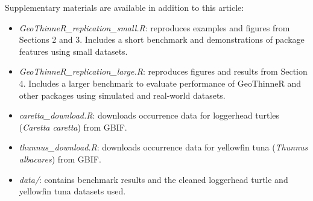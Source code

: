 Supplementary materials are available in addition to this article:

\begin{itemize}
\tightlist
\item
  \emph{GeoThinneR\_replication\_small.R}: reproduces examples and figures from Sections 2 and 3. Includes a short benchmark and demonstrations of package features using small datasets.
\item
  \emph{GeoThinneR\_replication\_large.R}: reproduces figures and results from Section 4. Includes a larger benchmark to evaluate performance of GeoThinneR and other packages using simulated and real-world datasets.
\item
  \emph{caretta\_download.R}: downloads occurrence data for loggerhead turtles (\emph{Caretta caretta}) from GBIF.
\item
  \emph{thunnus\_download.R}: downloads occurrence data for yellowfin tuna (\emph{Thunnus albacares}) from GBIF.
\item
  \emph{data/}: contains benchmark results and the cleaned loggerhead turtle and yellowfin tuna datasets used.
\end{itemize}



\address{%
Jorge Mestre-Tomás\\
Institut de Ciències del Mar (ICM-CSIC)Universitat Politècnica de València (UPV)\\%
Renewable Marine Resources Department, Barcelona, Spain\\ Department of Applied Statistics and Operational Research, and Quality, Valencia, Spain\\
%
\url{https://github.com/jmestret}\\%
\textit{ORCiD: \href{https://orcid.org/0000-0002-8983-3417}{0000-0002-8983-3417}}\\%
\href{mailto:jorgemestre@icm.csic.es}{\nolinkurl{jorgemestre@icm.csic.es}}%
}
